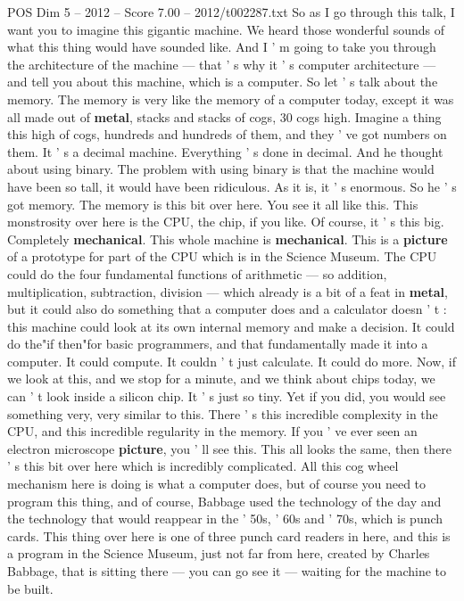 \begin{textsample}{POS Dim 5 – 2012 – Score 7.00 – 2012/t002287.txt}
So as I go through this talk, I want you to imagine this gigantic machine.
We heard those wonderful sounds of what this thing would have sounded like.
And I ' m going to take you through the architecture of the machine — that ' s why it ' s computer architecture — and tell you about this machine, which is a computer.
So let ' s talk about the memory.
The memory is very like the memory of a computer today, except it was all made out of \textbf{metal}, stacks and stacks of cogs, 30 cogs high.
Imagine a thing this high of cogs, hundreds and hundreds of them, and they ' ve got numbers on them.
It ' s a decimal machine.
Everything ' s done in decimal.
And he thought about using binary.
The problem with using binary is that the machine would have been so tall, it would have been ridiculous.
As it is, it ' s enormous.
So he ' s got memory.
The memory is this bit over here.
You see it all like this.
This monstrosity over here is the CPU, the chip, if you like.
Of course, it ' s this big.
Completely \textbf{mechanical}.
This whole machine is \textbf{mechanical}.
This is a \textbf{picture} of a prototype for part of the CPU which is in the Science Museum.
The CPU could do the four fundamental functions of arithmetic — so addition, multiplication, subtraction, division — which already is a bit of a feat in \textbf{metal}, but it could also do something that a computer does and a calculator doesn ' t : this machine could look at its own internal memory and make a decision.
It could do the"if then"for basic programmers, and that fundamentally made it into a computer.
It could compute.
It couldn ' t just calculate.
It could do more.
Now, if we look at this, and we stop for a minute, and we think about chips today, we can ' t look inside a silicon chip.
It ' s just so tiny.
Yet if you did, you would see something very, very similar to this.
There ' s this incredible complexity in the CPU, and this incredible regularity in the memory.
If you ' ve ever seen an electron microscope \textbf{picture}, you ' ll see this.
This all looks the same, then there ' s this bit over here which is incredibly complicated.
All this cog wheel mechanism here is doing is what a computer does, but of course you need to program this thing, and of course, Babbage used the technology of the day and the technology that would reappear in the ' 50s, ' 60s and ' 70s, which is punch cards.
This thing over here is one of three punch card readers in here, and this is a program in the Science Museum, just not far from here, created by Charles Babbage, that is sitting there — you can go see it — waiting for the machine to be built.

\end{textsample}
